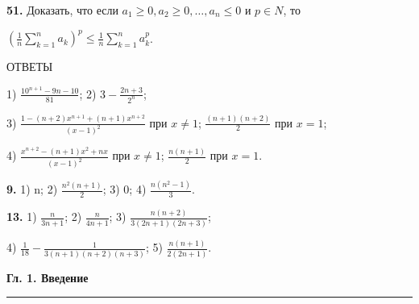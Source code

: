 \documentclass[a5paper, 10pt]{book}
\begin{document}
\begin{spacing}
    \par \textbf{51. } Доказать, что если $a_{1} \geq 0, a_{2} \geq 0, \ldots, a_{n} \leq 0$ и $p \in N$, то \per
    \begin{center}
        $(\frac{1}{n}\sum\limits_{k=1}^{n}{a_{k}})^{p} \leq \frac{1}{n}\sum\limits_{k=1}^{n}{a_{k}^{p}}$.
    \end{center}
    \par ОТВЕТЫ
    \par 1) $\frac{10^{n + 1} - 9n - 10}{81}$; 2) $3 - \frac{2n + 3}{2^n}$;
    \par 3) $\frac{1 - (n + 2)x^{n + 1} + (n + 1)x^{n + 2}}{(x - 1)^2}$ при $x \neq 1$; $\frac{(n + 1)(n + 2)}{2}$ при $x = 1$;
    \par 4) $\frac{x^{n + 2} - (n + 1)x^2 +nx}{(x - 1)^2}$ при $x \neq 1$; $\frac{n(n + 1)}{2}$ при $x = 1$.
    \par \textbf{9. } 1) n; 2) $\frac{n^2(n + 1)}{2}$; 3) 0; 4) $\frac{n(n^2 - 1)}{3}$.
    \par \textbf{13. } 1) $\frac{n}{3n + 1}$; 2) $\frac{n}{4n + 1}$; 3) $\frac{n(n + 2)}{3(2n + 1)(2n + 3)}$;
    \par 4) $\frac{1}{18} - \frac{1}{3(n + 1)(n + 2)(n + 3)}$; 5) $\frac{n(n + 1)}{2(2n + 1)}$.
\end{spacing}
\newpage
    \begin{center}
         \textbf{Гл. 1. Введение}
               \noindent\rule{\textwidth}{1pt}
    \end{center}
\end{document}
